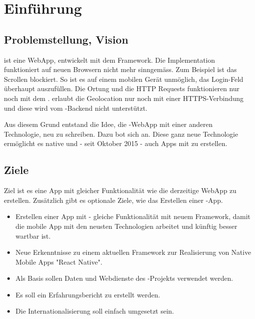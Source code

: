 \chapter{Einführung}
\label{tb-einfuehrung}

\section{Problemstellung, Vision}
\kort{} ist eine \gls{WebApp}, entwickelt mit dem  \gls{Framework}.
Die Implementation funktioniert auf neuen Browsern nicht mehr sinngemäss.
Zum Beispiel ist das Scrollen blockiert.
So ist es auf einem mobilen Gerät unmöglich, das Login-Feld überhaupt auszufüllen.
Die Ortung und die HTTP Requests funktionieren nur noch mit dem .
 erlaubt die Geolocation nur noch mit einer HTTPS-Verbindung und diese wird vom \kort{}-Backend nicht unterstützt.

Aus diesem Grund entstand die Idee, die \kort{}-\gls{WebApp} mit einer anderen Technologie, neu zu schreiben.
Dazu bot sich  an. 
Diese ganz neue Technologie ermöglicht es native  und - seit Oktober 2015 - auch  Apps mit  zu erstellen. 


\section{Ziele}
\label{tb-einfuehrung-ziele}
Ziel ist es eine  App mit gleicher Funktionalität wie die derzeitige \gls{WebApp} zu erstellen.
Zusätzlich gibt es optionale Ziele, wie das Erstellen einer -App.

\begin{itemize}
    Getestete Software-Entwicklungsumgebung 
	\item Erstellen einer  App mit  - gleiche Funktionalität mit neuem Framework, damit die mobile App mit den neusten Technologien arbeitet und künftig besser wartbar ist.
	\item Neue Erkenntnisse zu einem aktuellen Framework zur Realisierung von Native Mobile Apps "React Native".
	\item Als Basis sollen Daten und Webdienste des -Projekts verwendet werden.
	\item Es soll ein Erfahrungsbericht zu  erstellt werden.
	\item Die Internationalisierung soll einfach umgesetzt sein.
\end{itemize}


